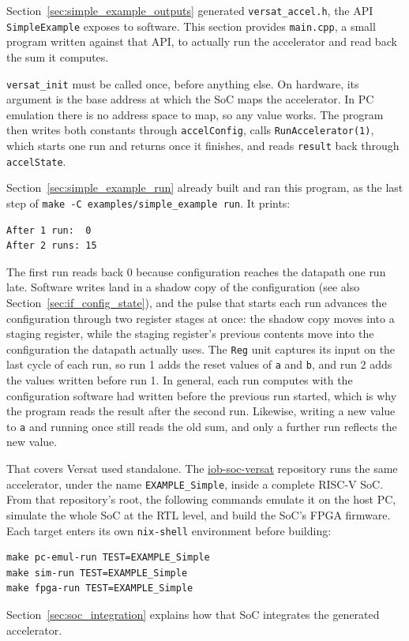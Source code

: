%

Section~\ref{sec:simple_example_outputs} generated \texttt{versat\_accel.h}, the API \texttt{SimpleExample} exposes to software. This section provides \texttt{main.cpp}, a small program written against that API, to actually run the accelerator and read back the sum it computes.



\texttt{versat\_init} must be called once, before anything else. On hardware, its argument is the base address at which the SoC maps the accelerator. In PC emulation there is no address space to map, so any value works. The program then writes both constants through \texttt{accelConfig}, calls \texttt{RunAccelerator(1)}, which starts one run and returns once it finishes, and reads \texttt{result} back through \texttt{accelState}.

Section~\ref{sec:simple_example_run} already built and ran this program, as the last step of \texttt{make -C examples/simple\_example run}. It prints:

\begin{lstlisting}
After 1 run:  0
After 2 runs: 15
\end{lstlisting}

The first run reads back 0 because configuration reaches the datapath one run late. Software writes land in a shadow copy of the configuration (see also Section~\ref{sec:if_config_state}), and the pulse that starts each run advances the configuration through two register stages at once: the shadow copy moves into a staging register, while the staging register's previous contents move into the configuration the datapath actually uses. The \texttt{Reg} unit captures its input on the last cycle of each run, so run 1 adds the reset values of \texttt{a} and \texttt{b}, and run 2 adds the values written before run 1. In general, each run computes with the configuration software had written before the previous run started, which is why the program reads the result after the second run. Likewise, writing a new value to \texttt{a} and running once still reads the old sum, and only a further run reflects the new value.

That covers Versat used standalone. The \href{https://github.com/IObundle/iob-soc-versat}{iob-soc-versat} repository runs the same accelerator, under the name \texttt{EXAMPLE\_Simple}, inside a complete RISC-V SoC. From that repository's root, the following commands emulate it on the host PC, simulate the whole SoC at the RTL level, and build the SoC's FPGA firmware. Each target enters its own \texttt{nix-shell} environment before building:

\begin{lstlisting}
make pc-emul-run TEST=EXAMPLE_Simple
make sim-run TEST=EXAMPLE_Simple
make fpga-run TEST=EXAMPLE_Simple
\end{lstlisting}

Section~\ref{sec:soc_integration} explains how that SoC integrates the generated accelerator.
